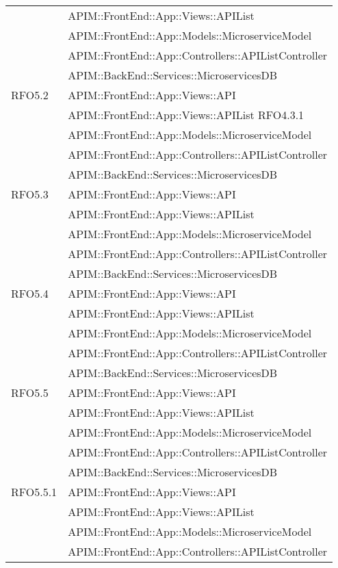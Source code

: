 \begin{longtable}{ p{4cm} | p{12cm} }
			& APIM::FrontEnd::App::Views::APIList \\
			& APIM::FrontEnd::App::Models::MicroserviceModel \\
			& APIM::FrontEnd::App::Controllers::APIListController \\
			& APIM::BackEnd::Services::MicroservicesDB \\
			\hline		
			RFO5.2
			& APIM::FrontEnd::App::Views::API \\
			& APIM::FrontEnd::App::Views::APIList RFO4.3.1 \\
			& APIM::FrontEnd::App::Models::MicroserviceModel \\
			& APIM::FrontEnd::App::Controllers::APIListController \\
			& APIM::BackEnd::Services::MicroservicesDB \\
			\hline		
			RFO5.3
			& APIM::FrontEnd::App::Views::API \\
			& APIM::FrontEnd::App::Views::APIList \\
			& APIM::FrontEnd::App::Models::MicroserviceModel \\
			& APIM::FrontEnd::App::Controllers::APIListController \\
			& APIM::BackEnd::Services::MicroservicesDB \\
			\hline		
			RFO5.4
			& APIM::FrontEnd::App::Views::API \\
			& APIM::FrontEnd::App::Views::APIList \\
			& APIM::FrontEnd::App::Models::MicroserviceModel \\
			& APIM::FrontEnd::App::Controllers::APIListController \\
			& APIM::BackEnd::Services::MicroservicesDB \\
			\hline		
			RFO5.5
			& APIM::FrontEnd::App::Views::API \\
			& APIM::FrontEnd::App::Views::APIList \\
			& APIM::FrontEnd::App::Models::MicroserviceModel \\
			& APIM::FrontEnd::App::Controllers::APIListController \\
			& APIM::BackEnd::Services::MicroservicesDB \\
			\hline		
			RFO5.5.1
			& APIM::FrontEnd::App::Views::API \\
			& APIM::FrontEnd::App::Views::APIList \\
			& APIM::FrontEnd::App::Models::MicroserviceModel \\
			& APIM::FrontEnd::App::Controllers::APIListController \\

\end{longtable}
